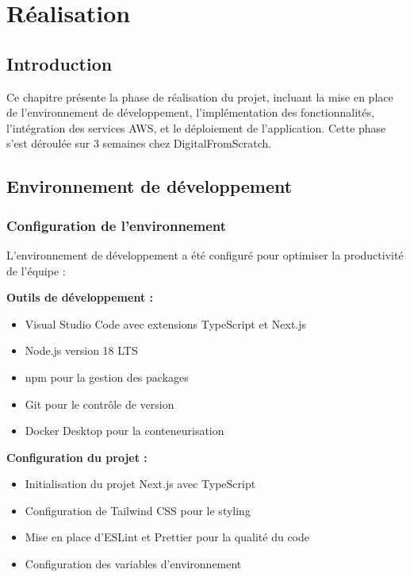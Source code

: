 \chapter{Réalisation}

\section{Introduction}

Ce chapitre présente la phase de réalisation du projet, incluant la mise en place de l'environnement de développement, l'implémentation des fonctionnalités, l'intégration des services AWS, et le déploiement de l'application. Cette phase s'est déroulée sur 3 semaines chez DigitalFromScratch.

\section{Environnement de développement}

\subsection{Configuration de l'environnement}

L'environnement de développement a été configuré pour optimiser la productivité de l'équipe :

\textbf{Outils de développement :}
\begin{itemize}
    \item Visual Studio Code avec extensions TypeScript et Next.js
    \item Node.js version 18 LTS
    \item npm pour la gestion des packages
    \item Git pour le contrôle de version
    \item Docker Desktop pour la conteneurisation
\end{itemize}

\textbf{Configuration du projet :}
\begin{itemize}
    \item Initialisation du projet Next.js avec TypeScript
    \item Configuration de Tailwind CSS pour le styling
    \item Mise en place d'ESLint et Prettier pour la qualité du code
    \item Configuration des variables d'environnement
\end{itemize}


